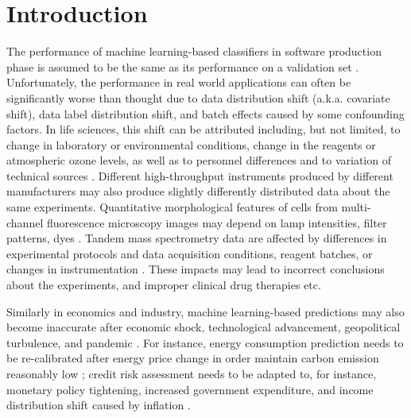 \documentclass{article}
\begin{document}
\section{Introduction}

The performance of machine learning-based classifiers in software production phase is assumed to be the same as its performance on a validation set  \cite{dmlsbook2022}. Unfortunately, the  performance in real world applications can often be significantly worse than thought due to data distribution shift (a.k.a. covariate shift), data label distribution shift, and batch effects \cite{Candela2009DatasetShift} caused by some confounding factors. In life sciences, this shift can be attributed including, but not limited, to change in laboratory or environmental conditions, change in the reagents or atmospheric ozone levels, as well as to personnel differences and to variation of technical sources \cite{leek2010tackling}. Different high-throughput instruments produced by different manufacturers may also produce slightly differently distributed data about the same experiments. Quantitative morphological features of cells from multi-channel fluorescence microscopy images may depend on lamp intensities, filter patterns, dyes \cite{bray2016cell}. Tandem mass spectrometry data are affected by differences in experimental protocols and data acquisition conditions, reagent batches, or changes in instrumentation \cite{phua2022perspectives, vcuklina2021diagnostics}. These impacts may lead to incorrect conclusions about the experiments, and improper clinical drug therapies etc. 

Similarly in economics and industry, machine learning-based predictions may also become inaccurate after economic shock, technological advancement, geopolitical turbulence, and pandemic \cite{ramey2016macroeconomic}. For instance, energy consumption prediction needs to be re-calibrated after energy price change in order maintain carbon emission reasonably low \cite{clement2023coping}; credit risk assessment needs to be adapted to, for instance, monetary policy tightening, increased government expenditure, and income distribution shift caused by inflation \cite{kritzman2012regime,guo2023predict}.
\end{document}

